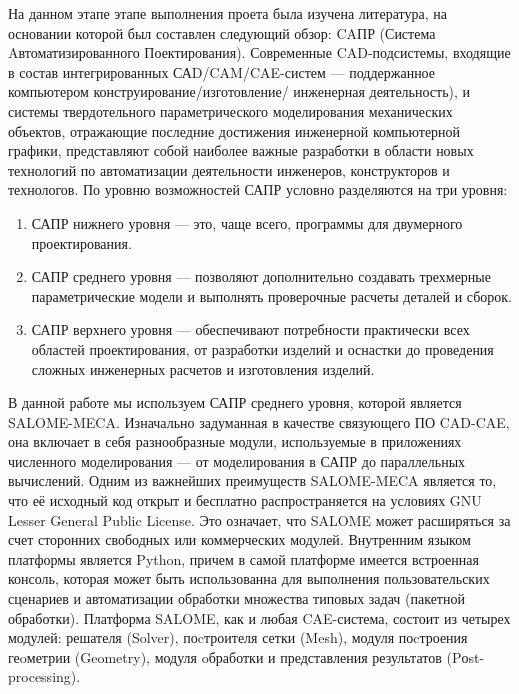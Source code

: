 \documentclass[a4paper,12pt]{article}
\theoremstyle{plain} %
\theoremstyle{definition} %
\theoremstyle{remark} %
\begin{document}
	На данном этапе этапе выполнения проета была изучена литература, на основании которой был составлен следующий обзор:
	CAПР (Система Aвтоматизированного Поектирования). Современные CAD-подсистемы, входящие в состав интегрированных САD/CAM/CAE-систем — поддержанное компьютером конструирование/изготовление/ инженерная деятельность), и системы твердотельного параметрического моделирования механических объектов, отражающие последние достижения инженерной компьютерной графики, представляют собой наиболее важные разработки в области новых технологий по автоматизации деятельности инженеров,	конструкторов и технологов. По уровню возможностей САПР условно разделяются на три уровня:
	\begin{enumerate}
		\item САПР нижнего уровня — это, чаще всего, программы для двумерного проектирования.
		\item САПР среднего уровня — позволяют дополнительно создавать трехмерные параметрические модели и выполнять проверочные расчеты деталей и сборок.
		\item САПР верхнего уровня — обеспечивают потребности практически всех областей проектирования, от разработки изделий и оснастки до проведения сложных инженерных расчетов и изготовления изделий\cite{bBolshakov}.
	\end{enumerate}
	В данной работе мы используем САПР среднего уровня, которой является SALOME-MECA. Изначально задуманная в качестве связующего ПО CAD-CAE, она включает в себя разнообразные модули, используемые в приложениях численного моделирования — от моделирования в САПР до параллельных вычислений. Одним из важнейших преимуществ SALOME-MECA является то, что её исходный код открыт и бесплатно распространяется на условиях GNU Lesser General Public License. Это означает, что SALOME может расширяться за счет сторонних свободных или коммерческих модулей. Внутренним языком платформы является Python, причем в самой платформе имеется встроенная консоль, которая может быть использованна для выполнения пользовательских сценариев и автоматизации обработки множества типовых задач (пакетной обработки)\cite{wOfDoc}. Платформа SALOME, как и любая CAE-система, состоит из четырех модулей: решателя (Solver), поcтроителя сетки (Mesh), модуля поcтроения геoметрии (Geometry), модуля oбработки и представления результатов (Pоst-processing).
			
\end{document}
